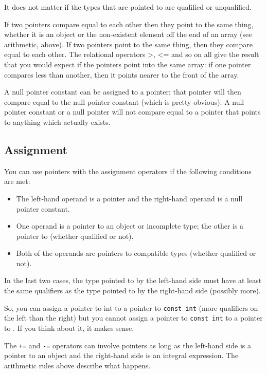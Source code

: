    It does not matter if the types that are pointed to are qualified or
    unqualified.


   If two pointers compare equal to each other then they point to the
    same thing, whether it is an object or the non-existent element off the
    end of an array (see arithmetic, above). If two pointers point to the
    same thing, then they compare equal to each other. The relational
    operators >, <= and so on all give the result that you would
    expect if the pointers point into the same array: if one pointer
    compares less than another, then it points nearer to the front of the
    array.


   A null pointer constant can be assigned to a pointer; that pointer
    will then compare equal to the null pointer constant (which is pretty
    obvious). A null pointer constant or a null pointer will not compare
    equal to a pointer that points to anything which actually exists.


  

  \subsection{Assignment}
   

   You can use pointers with the assignment operators if the following
    conditions are met:


   \begin{itemize}
    \item The left-hand operand is a pointer and the right-hand operand is a
     null pointer constant.
    \item One operand is a pointer to an object or incomplete type; the other
     is a pointer to \void{} (whether qualified or not).
    \item Both of the operands are pointers to compatible types (whether
     qualified or not).
   \end{itemize}

   In the last two cases, the type pointed to by the left-hand side must
    have at least the same qualifiers as the type pointed to by the
    right-hand side (possibly more).


   So, you can assign a pointer to int to a pointer to \texttt{const
    int} (more qualifiers on the left than the right) but you cannot
    assign a pointer to \texttt{const int} to a pointer to
    \kint. If you think about it, it makes sense.


   The \texttt{+=} and \texttt{-=} operators can involve pointers
    as long as the left-hand side is a pointer to an object and the
    right-hand side is an integral expression. The arithmetic rules above
    describe what happens.



